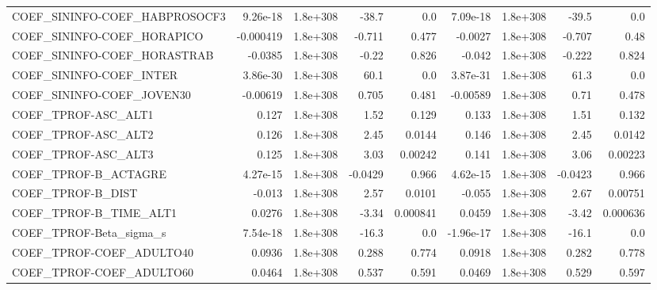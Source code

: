 \begin{tabular}{lrrrrrrrr}
COEF\_SININFO-COEF\_HABPROSOCF3     &    9.26e-18 &     1.8e+308 &     -38.7 &      0.0 &   7.09e-18 &    1.8e+308 &        -39.5 &           0.0 \\
COEF\_SININFO-COEF\_HORAPICO        &   -0.000419 &     1.8e+308 &    -0.711 &    0.477 &    -0.0027 &    1.8e+308 &       -0.707 &          0.48 \\
COEF\_SININFO-COEF\_HORASTRAB       &     -0.0385 &     1.8e+308 &     -0.22 &    0.826 &     -0.042 &    1.8e+308 &       -0.222 &         0.824 \\
COEF\_SININFO-COEF\_INTER           &    3.86e-30 &     1.8e+308 &      60.1 &      0.0 &   3.87e-31 &    1.8e+308 &         61.3 &           0.0 \\
COEF\_SININFO-COEF\_JOVEN30         &    -0.00619 &     1.8e+308 &     0.705 &    0.481 &   -0.00589 &    1.8e+308 &         0.71 &         0.478 \\
COEF\_TPROF-ASC\_ALT1               &       0.127 &     1.8e+308 &      1.52 &    0.129 &      0.133 &    1.8e+308 &         1.51 &         0.132 \\
COEF\_TPROF-ASC\_ALT2               &       0.126 &     1.8e+308 &      2.45 &   0.0144 &      0.146 &    1.8e+308 &         2.45 &        0.0142 \\
COEF\_TPROF-ASC\_ALT3               &       0.125 &     1.8e+308 &      3.03 &  0.00242 &      0.141 &    1.8e+308 &         3.06 &       0.00223 \\
COEF\_TPROF-B\_ACTAGRE              &    4.27e-15 &     1.8e+308 &   -0.0429 &    0.966 &   4.62e-15 &    1.8e+308 &      -0.0423 &         0.966 \\
COEF\_TPROF-B\_DIST                 &      -0.013 &     1.8e+308 &      2.57 &   0.0101 &     -0.055 &    1.8e+308 &         2.67 &       0.00751 \\
COEF\_TPROF-B\_TIME\_ALT1            &      0.0276 &     1.8e+308 &     -3.34 & 0.000841 &     0.0459 &    1.8e+308 &        -3.42 &      0.000636 \\
COEF\_TPROF-Beta\_sigma\_s           &    7.54e-18 &     1.8e+308 &     -16.3 &      0.0 &  -1.96e-17 &    1.8e+308 &        -16.1 &           0.0 \\
COEF\_TPROF-COEF\_ADULTO40          &      0.0936 &     1.8e+308 &     0.288 &    0.774 &     0.0918 &    1.8e+308 &        0.282 &         0.778 \\
COEF\_TPROF-COEF\_ADULTO60          &      0.0464 &     1.8e+308 &     0.537 &    0.591 &     0.0469 &    1.8e+308 &        0.529 &         0.597 \\

\end{tabular}
